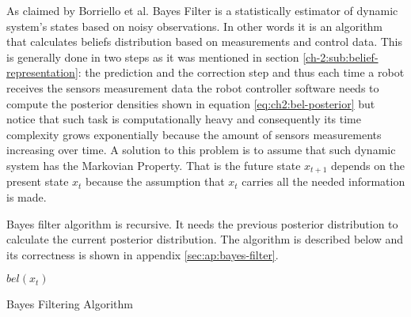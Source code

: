 As claimed by Borriello et al. Bayes Filter is a statistically estimator of dynamic system's states based on noisy observations. In other words it is an algorithm that calculates beliefs distribution based on measurements and control data\cite{Thrun:2005:PR:1121596}. This is generally done in two steps as it was mentioned in section \ref{ch-2:sub:belief-representation}: the prediction and the correction step and thus each time a robot receives the sensors measurement data the robot controller software needs to compute the posterior densities shown in equation \ref{eq:ch2:bel-posterior} but notice that such task is computationally heavy and consequently its time complexity grows exponentially because the amount of sensors measurements increasing over time. A solution to this problem is to assume that such dynamic system has the Markovian Property. That is the future state $x_{t+1}$ depends on the present state $x_t$ because the assumption that $x_t$ carries all the needed information is made\cite{Liao:bayesian-filters}.

Bayes filter algorithm is recursive. It needs the previous posterior distribution to calculate the current posterior distribution. The algorithm is described below and its correctness is shown in appendix \ref{sec:ap:bayes-filter}.

\IncMargin{1em}
\begin{algorithm}

\BlankLine

  \Return $bel(x_t)$
\caption{Bayes Filtering Algorithm\cite{Thrun:2005:PR:1121596}}

\label{ch-2:algo:bayes-filter}
\end{algorithm}\DecMargin{1em}


